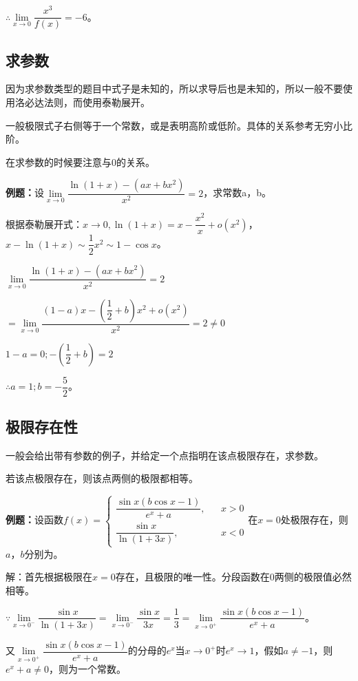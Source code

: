 $\therefore \lim\limits_{x\to 0}\dfrac{x^3}{f(x)}=-6$。

\subsection{求参数}

因为求参数类型的题目中式子是未知的，所以求导后也是未知的，所以一般不要使用洛必达法则，而使用泰勒展开。

一般极限式子右侧等于一个常数，或是表明高阶或低阶。具体的关系参考无穷小比阶。

在求参数的时候要注意与0的关系。\medskip

\textbf{例题：}设$\lim\limits_{x\to 0}\dfrac{\ln(1+x)-(ax+bx^2)}{x^2}=2$，求常数a，b。

根据泰勒展开式：$x\to 0,\ln(1+x)=x-\dfrac{x^2}{x}+o(x^2)$，$x-\ln(1+x)\sim\dfrac{1}{2}x^2\sim 1-\cos x$。

$\lim\limits_{x\to 0}\dfrac{\ln(1+x)-(ax+bx^2)}{x^2}=2$

$=\lim\limits_{x\to 0}\dfrac{(1-a)x-\left(\dfrac{1}{2}+b\right)x^2+o(x^2)}{x^2}=2\neq 0$

$1-a=0;-\left(\dfrac{1}{2}+b\right)=2$\medskip

$\therefore a=1;b=-\dfrac{5}{2}$。

\subsection{极限存在性}

一般会给出带有参数的例子，并给定一个点指明在该点极限存在，求参数。

若该点极限存在，则该点两侧的极限都相等。\medskip

\textbf{例题：}设函数$f(x)=\left\{\begin{array}{lcl}
                                \dfrac{\sin x(b\cos x-1)}{e^x+a}, & & x>0 \\
                                \dfrac{\sin x}{\ln(1+3x)},        & & x<0
\end{array}
\right.$在$x=0$处极限存在，则$a$，$b$分别为。

解：首先根据极限在$x=0$存在，且极限的唯一性。分段函数在0两侧的极限值必然相等。

$\because\lim\limits_{x\to 0^-}\dfrac{\sin x}{\ln(1+3x)}=\lim\limits_{x\to 0^-}\dfrac{\sin x}{3x}=\dfrac{1}{3}=\lim\limits_{x\to 0^+}\dfrac{\sin x(b\cos x-1)}{e^x+a}$。

\medskip

又$\lim\limits_{x\to 0^+}\dfrac{\sin x(b\cos x-1)}{e^x+a}$的分母的$e^x$当$x\to 0^+$时$e^x\to 1$，假如$a\neq-1$，则$e^x+a\neq 0$，则为一个常数。

